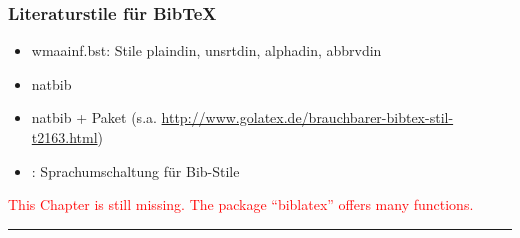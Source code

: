 \subsubsection*{Literaturstile für BibTeX}
{\small
\begin{itemize}
	\item wmaainf.bst: Stile plaindin, unsrtdin, alphadin, abbrvdin
	\item natbib
	\item natbib + Paket  (s.a. \url{http://www.golatex.de/brauchbarer-bibtex-stil-t2163.html})
	\item {}: Sprachumschaltung für Bib-Stile
\end{itemize}
}

\textcolor{red}{\footnotesize
This Chapter is still missing. The package ``biblatex'' offers many functions.
}

\hrule \vspace{0.5\baselineskip}
